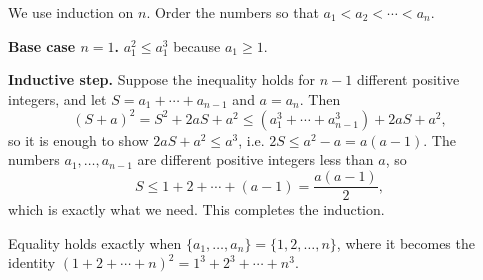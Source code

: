 We use induction on $n$. Order the numbers so that $a_1<a_2<\cdots<a_n$.

\textbf{Base case $n=1$.} $a_1^2\le a_1^3$ because $a_1\ge1$.

\textbf{Inductive step.} Suppose the inequality holds for $n-1$ different positive integers, and let $S=a_1+\cdots+a_{n-1}$ and $a=a_n$. Then
\[(S+a)^2=S^2+2aS+a^2\le\left(a_1^3+\cdots+a_{n-1}^3\right)+2aS+a^2,\]
so it is enough to show $2aS+a^2\le a^3$, i.e. $2S\le a^2-a=a(a-1)$. The numbers $a_1,\ldots,a_{n-1}$ are different positive integers less than $a$, so
\[S\le1+2+\cdots+(a-1)=\dfrac{a(a-1)}{2},\]
which is exactly what we need. This completes the induction.

Equality holds exactly when $\{a_1,\ldots,a_n\}=\{1,2,\ldots,n\}$, where it becomes the identity $(1+2+\cdots+n)^2=1^3+2^3+\cdots+n^3$.
